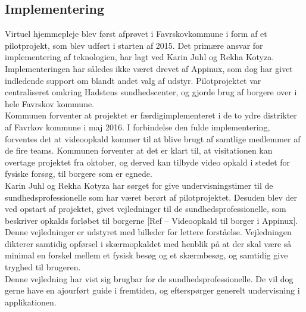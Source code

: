 \subsection{Implementering}
Virtuel hjemmepleje blev først afprøvet i Favrskovkommune i form af et pilotprojekt, som blev udført i starten af 2015. Det primære ansvar for implementering af teknologien, har lagt ved Karin Juhl og Rekha Kotyza. Implementeringen har således ikke været drevet af Appinux, som dog har givet indledende support om blandt andet valg af udstyr. Pilotprojektet var centraliseret omkring Hadstens sundhedscenter, og gjorde brug af borgere over i hele Favrskov kommune. \\
Kommunen forventer at projektet er færdigimplementeret i de to ydre distrikter af Favrkov kommune i maj 2016. I forbindelse den fulde implementering, forventes det at videoopkald kommer til at blive brugt af samtlige medlemmer af de fire teams. Kommunen forventer at det er klart til, at visitationen kan overtage projektet fra oktober, og derved kan tilbyde video opkald i stedet for fysiske forsøg, til borgere som er egnede. \\
Karin Juhl og Rekha Kotyza har sørget for give undervisningstimer til de sundhedsprofessionelle som har været berørt af pilotprojektet. Desuden blev der ved opstart af projektet, givet vejledninger til de sundhedsprofessionelle, som beskriver opkalds forløbet til borgerne [Ref – Videoopkald til borger i Appinux]. Denne vejledninger er udstyret med billeder for lettere forståelse. Vejledningen dikterer samtidig opførsel i skærmopkaldet med henblik på at der skal være så minimal en forskel mellem et fysisk besøg og et skærmbesøg, og samtidig give tryghed til brugeren. \\
Denne vejledning har vist sig brugbar for de sundhedsprofessionelle. De vil dog gerne have en ajourført guide i fremtiden, og efterspørger generelt undervisning i applikationen. \\

 

